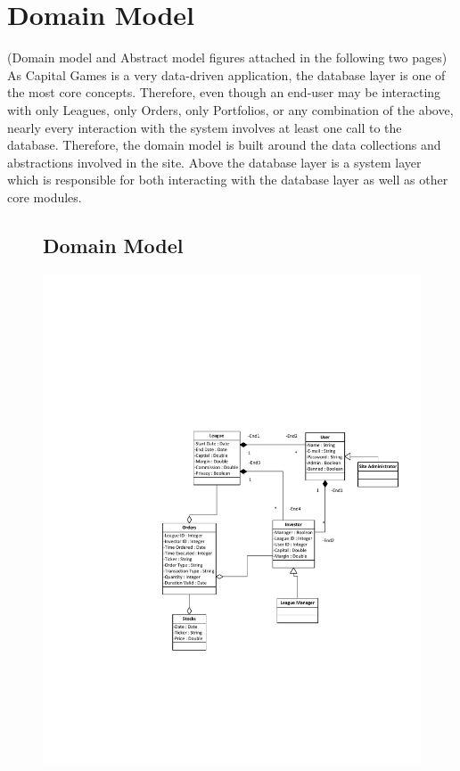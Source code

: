 \chapter{Domain Model}

(Domain model and Abstract model figures attached in the following two pages) \\

As Capital Games is a very data-driven application, the database layer is
one of the most core concepts. Therefore, even though an end-user may
be interacting with only Leagues, only Orders, only Portfolios, or any
combination of the above, nearly every interaction with the system
involves at least one call to the database. Therefore, the domain model
is built around the data collections and abstractions involved in the site.
Above the database layer is a system layer which is responsible for both
interacting with the database layer as well as other core modules.

\begin{figure}
\section{Domain Model}
\centering
\includegraphics[width=5.5in]{./img/domainModel.pdf}
\caption{ }
\end{figure}

